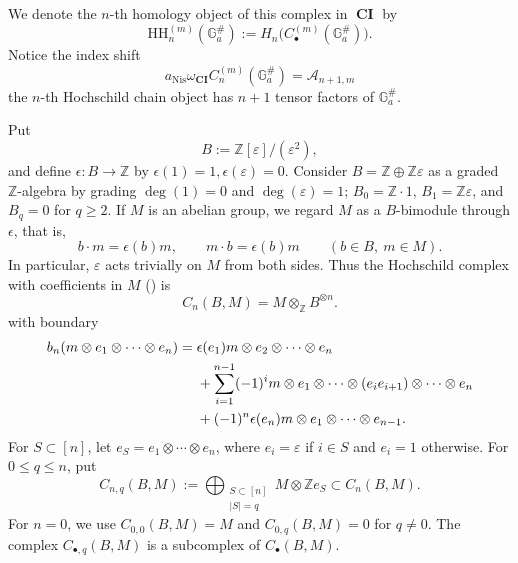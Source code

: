 \documentclass[a4paper,12pt,reqno]{amsart}
\numberwithin{equation}{section}
\theoremstyle{definition}
\newcommand{\Z}{\mathbb{Z}}
\newcommand{\CI}{\operatorname{\mathbf{CI}}}
\newcommand{\Acal}{\mathcal{A}}
\newcommand{\GaSharp}{\mathbb{G}_{a}^{\#}}
\newcommand{\Nis}{\mathrm{Nis}}
\begin{document}
We denote the $n$-th homology object of this complex in $\CI$ by
\begin{equation}\label{eq:HHm-def}
 \mathrm{HH}_n^{(m)}(\GaSharp)
 :=
 H_n\bigl(C_\bullet^{(m)}(\GaSharp)\bigr).
\end{equation}
 Notice the index shift
\begin{equation}\label{eq:HH-shift}
 a_{\Nis}\omega_{\CI}C_n^{(m)}(\GaSharp)=\Acal_{n+1,m} 
\end{equation}
the $n$-th Hochschild chain object has $n+1$ tensor factors of $\GaSharp$.

Put 
\begin{equation}\label{eq:HH-B}
 B:=\Z[\varepsilon]/(\varepsilon^2),
\end{equation} 
and define $\epsilon\colon B\to \Z$ by $\epsilon(1) = 1, \epsilon(\varepsilon) = 0$. 
Consider $B = \Z\oplus \Z\varepsilon$ as a graded $\Z$-algebra by 
grading $\deg(1) = 0$ and $\deg(\varepsilon) = 1$; 
$B_0 = \Z\cdot 1$, $B_1 = \Z\varepsilon$, and $B_q = 0$ for $q\ge 2$. 
If $M$ is an abelian group, 
we regard $M$ as a $B$-bimodule through $\epsilon$, that is,
\[
 b\cdot m=\epsilon(b)m,\qquad m\cdot b=\epsilon(b)m
 \qquad (b\in B,\ m\in M).
\]
In particular, $\varepsilon$ acts trivially on $M$ from both sides.
Thus the Hochschild complex with coefficients in $M$ (\cite[Section~1.1.1--1.1.3]{Lod98}) is 
\begin{equation}\label{eq:HH-Loday}
 C_n(B,M)=M\otimes_{\Z}B^{\otimes n}.
\end{equation}
with boundary
\begin{align}
 b_n(m\otimes e_1\otimes\cdots\otimes e_n)
 ={}&\epsilon(e_1)m\otimes e_2\otimes\cdots\otimes e_n\notag\\
 &+\sum_{i=1}^{n-1}(-1)^i
 m\otimes e_1\otimes\cdots\otimes(e_ie_{i+1})
 \otimes\cdots\otimes e_n\notag\\
 &+(-1)^n\epsilon(e_n)m\otimes
 e_1\otimes\cdots\otimes e_{n-1}.
\end{align}
For $S\subset[n]$, let
$e_S=e_1\otimes\cdots\otimes e_n$, where $e_i=\varepsilon$ if $i\in S$
and $e_i=1$ otherwise.  For $0\leq q\leq n$, put
\begin{equation}\label{eq:HH-Cmq}
 C_{n,q}(B,M)
 :=\bigoplus_{\substack{S\subset[n]\\|S|=q}} M\otimes\Z e_S
 \subset C_n(B,M).
\end{equation}
For $n=0$, we use $C_{0,0}(B,M)=M$ and $C_{0,q}(B,M)=0$ for $q\neq0$.
The complex $C_{\bullet,q}(B,M)$ is a subcomplex of $C_\bullet(B,M)$.
\end{document}
